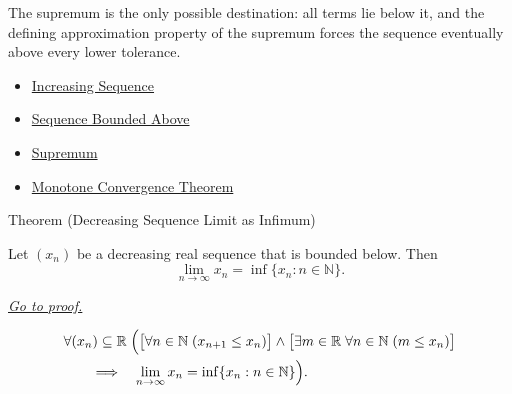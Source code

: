 \begin{remark*}[Interpretation]
The supremum is the only possible destination: all terms lie below it, and
the defining approximation property of the supremum forces the sequence
eventually above every lower tolerance.
\end{remark*}

\begin{dependencies}
\begin{itemize}
  \item \hyperref[def:increasing-sequence]{Increasing Sequence}
  \item \hyperref[def:sequence-bounded-above]{Sequence Bounded Above}
  \item \hyperref[def:supremum]{Supremum}
  \item \hyperref[thm:monotone-convergence-theorem]{Monotone Convergence Theorem}
\end{itemize}
\end{dependencies}


\begin{theorembox}{Theorem (Decreasing Sequence Limit as Infimum)}
\begin{theorem}
\label{thm:decreasing-sequence-limit-as-infimum}
Let $(x_n)$ be a decreasing real sequence that is bounded below. Then
\[
  \lim_{n\to\infty}x_n=\inf\{x_n:n\in\mathbb{N}\}.
\]

\smallskip
\noindent
\hyperref[prf:decreasing-sequence-limit-as-infimum]{\textit{Go to proof.}}
\end{theorem}
\end{theorembox}

\begin{remark*}
\[
\begin{aligned}
&\forall (x_n)\subseteq\mathbb{R}\;
\Bigl(
  \bigl[\forall n\in\mathbb{N}\;(x_{n+1}\le x_n)\bigr]
  \land
  \bigl[\exists m\in\mathbb{R}\;\forall n\in\mathbb{N}\;(m\le x_n)\bigr]\\
&\qquad\Longrightarrow\quad
  \lim_{n\to\infty}x_n=\inf\{x_n:n\in\mathbb{N}\}
\Bigr).
\end{aligned}
\]
\end{remark*}


